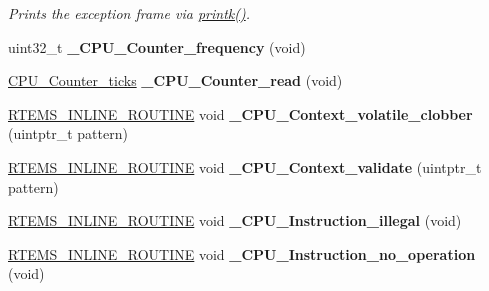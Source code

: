 \begin{DoxyCompactItemize}
\begin{DoxyCompactList}\small\item\em Prints the exception frame via \mbox{\hyperlink{bspIo_8h_a380cfecc8035cec8a13b68c0cb90f32f}{printk()}}. \end{DoxyCompactList}\item 
\mbox{\label{group__RTEMSScoreCPUMIPS_gaa675150e5d00169c99410a82011b6117}} 
uint32\+\_\+t {\bfseries \+\_\+\+C\+P\+U\+\_\+\+Counter\+\_\+frequency} (void)
\item 
\mbox{\label{group__RTEMSScoreCPUMIPS_gac016ae4ed92ed2607bd65408a36d908b}} 
\mbox{\hyperlink{no__cpu_2include_2rtems_2score_2cpu_8h_a67f8550aad58bccb6fcb4589894444ad}{C\+P\+U\+\_\+\+Counter\+\_\+ticks}} {\bfseries \+\_\+\+C\+P\+U\+\_\+\+Counter\+\_\+read} (void)
\item 
\mbox{\label{group__RTEMSScoreCPUMIPS_gaeb1ddd8f84f82b13fad2a05a3e7d0ab7}} 
\mbox{\hyperlink{group__RTEMSScoreBaseDefs_gac216239df231d5dbd15e3520b0b9313f}{R\+T\+E\+M\+S\+\_\+\+I\+N\+L\+I\+N\+E\+\_\+\+R\+O\+U\+T\+I\+NE}} void {\bfseries \+\_\+\+C\+P\+U\+\_\+\+Context\+\_\+volatile\+\_\+clobber} (uintptr\+\_\+t pattern)
\item 
\mbox{\label{group__RTEMSScoreCPUMIPS_gaae027d9a906bb67d38ebd7a9104b976b}} 
\mbox{\hyperlink{group__RTEMSScoreBaseDefs_gac216239df231d5dbd15e3520b0b9313f}{R\+T\+E\+M\+S\+\_\+\+I\+N\+L\+I\+N\+E\+\_\+\+R\+O\+U\+T\+I\+NE}} void {\bfseries \+\_\+\+C\+P\+U\+\_\+\+Context\+\_\+validate} (uintptr\+\_\+t pattern)
\item 
\mbox{\label{group__RTEMSScoreCPUMIPS_ga07618c93359f2485af2e98a96b330208}} 
\mbox{\hyperlink{group__RTEMSScoreBaseDefs_gac216239df231d5dbd15e3520b0b9313f}{R\+T\+E\+M\+S\+\_\+\+I\+N\+L\+I\+N\+E\+\_\+\+R\+O\+U\+T\+I\+NE}} void {\bfseries \+\_\+\+C\+P\+U\+\_\+\+Instruction\+\_\+illegal} (void)
\item 
\mbox{\label{group__RTEMSScoreCPUMIPS_gab683a0a37a089e2a0fd3c356836d5499}} 
\mbox{\hyperlink{group__RTEMSScoreBaseDefs_gac216239df231d5dbd15e3520b0b9313f}{R\+T\+E\+M\+S\+\_\+\+I\+N\+L\+I\+N\+E\+\_\+\+R\+O\+U\+T\+I\+NE}} void {\bfseries \+\_\+\+C\+P\+U\+\_\+\+Instruction\+\_\+no\+\_\+operation} (void)
\end{DoxyCompactItemize}
